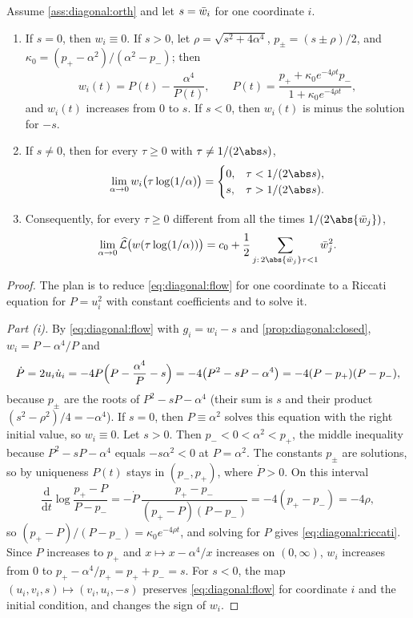 \begin{refsection}
\begin{theorem}\label{thm:diagonal:orth}
Assume \cref{ass:diagonal:orth} and let $s=\bar w_i$ for one coordinate $i$.
\begin{enumerate}
\item If $s=0$, then $w_i\equiv0$. If $s>0$, let $\rho=\sqrt{s^2+4\alpha^4}$, $p_\pm=(s\pm\rho)/2$, and $\kappa_0=(p_+-\alpha^2)/(\alpha^2-p_-)$; then
\begin{equation}\label{eq:diagonal:riccati}
  w_i(t)=P(t)-\frac{\alpha^4}{P(t)},\qquad P(t)=\frac{p_++\kappa_0e^{-4\rho t}p_-}{1+\kappa_0e^{-4\rho t}},
\end{equation}
and $w_i(t)$ increases from $0$ to $s$. If $s<0$, then $w_i(t)$ is minus the solution for $-s$.
\item If $s\ne0$, then for every $\tau\ge0$ with $\tau\ne1/(2\abs s)$,
\[
  \lim_{\alpha\to0}w_i\bigl(\tau\log(1/\alpha)\bigr)=\begin{cases}0,&\tau<1/(2\abs s),\\ s,&\tau>1/(2\abs s).\end{cases}
\]
\item Consequently, for every $\tau\ge0$ different from all the times $1/(2\abs{\diagbar_j})$,
\[
  \lim_{\alpha\to0}\Lhat\bigl(w(\tau\log(1/\alpha))\bigr)=c_0+\frac12\sum_{j:\,2\abs{\diagbar_j}\tau<1}\diagbar_j^2 .
\]
\end{enumerate}
\end{theorem}

\begin{proof}
The plan is to reduce \eqref{eq:diagonal:flow} for one coordinate to a Riccati equation for $P=u_i^2$ with constant coefficients and to solve it.

\emph{Part (i).} By \eqref{eq:diagonal:flow} with $g_i=w_i-s$ and \cref{prop:diagonal:closed}, $w_i=P-\alpha^4/P$ and
\[
  \dot P=2u_i\dot u_i=-4P\Bigl(P-\frac{\alpha^4}P-s\Bigr)=-4\bigl(P^2-sP-\alpha^4\bigr)=-4(P-p_+)(P-p_-),
\]
because $p_\pm$ are the roots of $P^2-sP-\alpha^4$ (their sum is $s$ and their product $(s^2-\rho^2)/4=-\alpha^4$). If $s=0$, then $P\equiv\alpha^2$ solves this equation with the right initial value, so $w_i\equiv0$. Let $s>0$. Then $p_-<0<\alpha^2<p_+$, the middle inequality because $P^2-sP-\alpha^4$ equals $-s\alpha^2<0$ at $P=\alpha^2$. The constants $p_\pm$ are solutions, so by uniqueness $P(t)$ stays in $(p_-,p_+)$, where $\dot P>0$. On this interval
\[
  \frac{\mathrm d}{\mathrm dt}\log\frac{p_+-P}{P-p_-}=-\dot P\,\frac{p_+-p_-}{(p_+-P)(P-p_-)}=-4(p_+-p_-)=-4\rho,
\]
so $(p_+-P)/(P-p_-)=\kappa_0e^{-4\rho t}$, and solving for $P$ gives \eqref{eq:diagonal:riccati}. Since $P$ increases to $p_+$ and $x\mapsto x-\alpha^4/x$ increases on $(0,\infty)$, $w_i$ increases from $0$ to $p_+-\alpha^4/p_+=p_++p_-=s$. For $s<0$, the map $(u_i,v_i,s)\mapsto(v_i,u_i,-s)$ preserves \eqref{eq:diagonal:flow} for coordinate $i$ and the initial condition, and changes the sign of $w_i$.


\end{proof}
\end{refsection}
